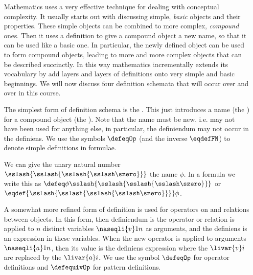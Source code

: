 \documentclass[notes,mh]{mikoslides}
\begin{document}
\begin{module}[id=mathtalk-definitions]

\begin{note}
\begin{omtext}
  Mathematics uses a very effective technique for dealing with conceptual complexity. It
  usually starts out with discussing simple, {\emph{basic}} objects and their
  properties. These simple objects can be combined to more complex, {\emph{compound}}
  ones. Then it uses a definition to give a compound object a new name, so that it can be
  used like a basic one. In particular, the newly defined object can be used to form
  compound objects, leading to more and more complex objects that can be described
  succinctly. In this way mathematics incrementally extends its vocabulary by add layers
  and layers of definitions onto very simple and basic beginnings. We will now discuss
  four definition schemata that will occur over and over in this course.
\end{omtext}

\begin{definition}[id=simpledef.def,for={eqdef,defeq}]
  The simplest form of definition schema is the . This just
  introduces a name (the ) for a compound object (the
  ). Note that the name must be new, i.e. may not have been used for
  anything else, in particular, the definiendum may not occur in the definiens. We use the
  symbols $\defeqOp$ (and the inverse $\eqdefFN$) to denote simple definitions in formulae.
 \end{definition}

 \begin{example}[id=one.def,for=simpledef.def]
   We can give the unary natural number $\sslash{\sslash{\sslash{\sslash\szero}}}$ the
   name $\phi$. In a formula we write this as
   $\defeq\phi{\sslash{\sslash{\sslash{\sslash\szero}}}}$ or
   $\eqdef{\sslash{\sslash{\sslash{\sslash\szero}}}}\phi$.
 \end{example}

\begin{definition}[id=pattern.def,for=defequiv]
  A somewhat more refined form of definition is used for operators on and relations
  between objects. In this form, then definiendum is the operator or relation is applied
  to $n$ distinct variables $\naseqli{v}1n$ as arguments, and the definiens is an expression
  in these variables. When the new operator is applied to arguments $\naseqli{a}1n$, then
  its value is the definiens expression where the $\livar{v}i$ are replaced by the
  $\livar{a}i$. We use the symbol $\defeqOp$ for operator definitions and $\defequivOp$
  for pattern definitions.
\end{definition}


\end{note}
\end{module}
\end{document}
